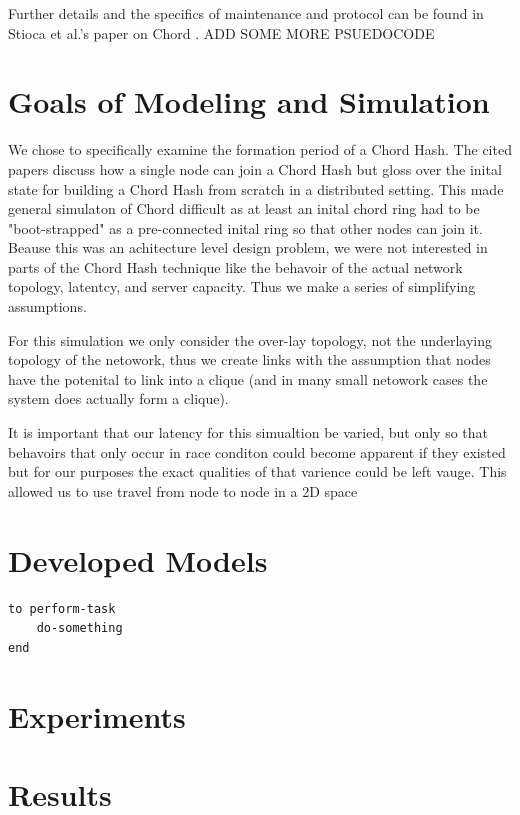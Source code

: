 \documentclass[12pt]{article} %
\begin{document}
Further details and the specifics of maintenance and protocol can be found in Stioca et al.'s paper on Chord \cite{Chord}.
ADD SOME MORE PSUEDOCODE


\section{Goals of Modeling and Simulation}
We chose to specifically examine the formation period of a Chord Hash. The cited papers discuss how a single node can join a Chord Hash but gloss over the inital state for building a Chord Hash from scratch in a distributed setting. This made general simulaton of Chord difficult as at least an inital chord ring had to be "boot-strapped" as a pre-connected inital ring so that other nodes can join it. Beause this was an achitecture level design problem, we were not interested in parts of the Chord Hash technique like the behavoir of the actual network topology, latentcy, and server capacity. Thus we make a series of simplifying assumptions.

For this simulation we only consider the over-lay topology, not the underlaying topology of the netowork, thus we create links with the assumption that nodes have the potenital to link into a clique (and in many small netowork cases the system does actually form a clique).

It is important that our latency for this simualtion be varied, but only so that behavoirs that only occur in race conditon could become apparent if they existed but for our purposes the exact qualities of that varience could be left vauge. This allowed us to use travel from node to node in a 2D space


\section{Developed Models}




\begin{lstlisting}
to perform-task
	do-something
end
\end{lstlisting}


\section{Experiments}

\section{Results}
\end{document}
